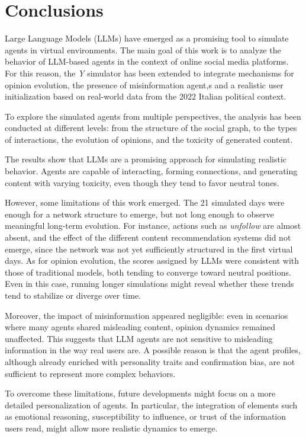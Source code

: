 \section{Conclusions}
\label{sec:conclusions}

Large Language Models (LLMs) have emerged as a promising tool to simulate agents in virtual environments. 
The main goal of this work is to analyze the behavior of LLM-based agents in the context of online social media platforms.
For this reason, the \textit{Y} simulator has been extended to integrate mechanisms for opinion evolution, the presence of misinformation agent,s and a realistic user initialization based on real-world data from the 2022 Italian political context.

\medskip
To explore the simulated agents from multiple perspectives, the analysis has been conducted at different levels: from the structure of the social graph, to the types of interactions, the evolution of opinions, and the toxicity of generated content.

The results show that LLMs are a promising approach for simulating realistic behavior. Agents are capable of interacting, forming connections, and generating content with varying toxicity, even though they tend to favor neutral tones.

\medskip
However, some limitations of this work emerged.
The 21 simulated days were enough for a network structure to emerge, but not long enough to observe meaningful long-term evolution.
For instance, actions such as \textit{unfollow} are almost absent, and the effect of the different content recommendation systems did not emerge, since the network was not yet sufficiently structured in the first virtual days.
As for opinion evolution, the scores assigned by LLMs were consistent with those of traditional models, both tending to converge toward neutral positions. 
Even in this case, running longer simulations might reveal whether these trends tend to stabilize or diverge over time.

Moreover, the impact of misinformation appeared negligible: even in scenarios where many agents shared misleading content, opinion dynamics remained unaffected.
This suggests that LLM agents are not sensitive to misleading information in the way real users are.
A possible reason is that the agent profiles, although already enriched with personality traits and confirmation bias, are not sufficient to represent more complex behaviors.

\medskip
To overcome these limitations, future developments might focus on a more detailed personalization of agents.
In particular, the integration of elements such as emotional reasoning, susceptibility to influence, or trust of the information users read, might allow more realistic dynamics to emerge.

